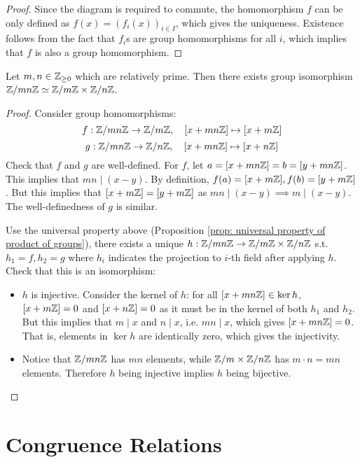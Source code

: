 \begin{proof}
    Since the diagram is required to commute, the homomorphism $f$ can be only defined as $f(x) = (f_i(x))_{i \in I}$, which gives the uniqueness. Existence follows from the fact that $f_i$s are group homomorphisms for all $i$, which implies that $f$ is also a group homomorphism.
\end{proof}

\begin{example}
    Let $m, n \in \mathbb{Z}_{\geq 0}$ which are relatively prime. Then there exists group isomorphism $\mathbb{Z}/mn\mathbb{Z} \simeq \mathbb{Z}/m\mathbb{Z} \times \mathbb{Z}/n\mathbb{Z}$.
\end{example}

\begin{proof}
    Consider group homomorphisms: 
    \[
        f: \mathbb{Z}/mn\mathbb{Z} \to \mathbb{Z}/m\mathbb{Z}, \quad [x + mn\mathbb{Z}] \mapsto [x + m\mathbb{Z}]
    \]
    \[
        g: \mathbb{Z}/mn\mathbb{Z} \to \mathbb{Z}/n\mathbb{Z}, \quad [x + mn\mathbb{Z}] \mapsto [x + n\mathbb{Z}]
    \]
    Check that $f$ and $g$ are well-defined. For $f$, let $a = [x + mn\mathbb{Z}] = b = [y + mn\mathbb{Z}]$. This implies that $mn \mid (x - y)$. By definition, $f(a) = [x + m\mathbb{Z}], f(b) = [y + m\mathbb{Z}]$. But this implies that $[x + m\mathbb{Z}] = [y + m\mathbb{Z}]$ as $mn \mid (x - y) \implies m \mid (x - y)$. The well-definedness of $g$ is similar.

    Use the universal property above (Proposition \ref{prop: universal property of product of groups}), there exists a unique $h: \mathbb{Z}/mn\mathbb{Z} \to \mathbb{Z}/m\mathbb{Z} \times \mathbb{Z}/n\mathbb{Z}$ s.t. $h_1 = f, h_2 = g$ where $h_i$ indicates the projection to $i$-th field after applying $h$. Check that this is an isomorphism:
    \begin{itemize}
        \item $h$ is injective. Consider the kernel of $h$: for all $[x + mn\mathbb{Z}] \in \ker h$, $[x + m\mathbb{Z}] = 0$ and $[x + n\mathbb{Z}] = 0$ as it must be in the kernel of both $h_1$ and $h_2$. But this implies that $m \mid x$ and $n \mid x$, i.e. $mn \mid x$, which gives $[x + mn\mathbb{Z}] = 0$. That is, elements in $\ker h$ are identically zero, which gives the injectivity.
        \item Notice that $\mathbb{Z}/mn\mathbb{Z}$ has $mn$ elements, while $\mathbb{Z}/m \times \mathbb{Z}/n\mathbb{Z}$ has $m \cdot n = mn$ elements. Therefore $h$ being injective implies $h$ being bijective. 
    \end{itemize}
\end{proof}

\section{Congruence Relations}

